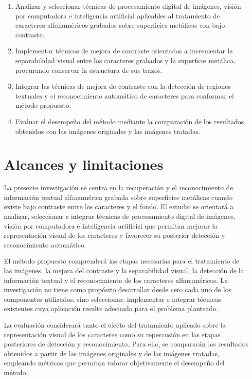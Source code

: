 \begin{enumerate}
    \item Analizar y seleccionar técnicas de procesamiento digital de imágenes, visión por computadora e inteligencia artificial aplicables al tratamiento de caracteres alfanuméricos grabados sobre superficies metálicas con bajo contraste.

    \item Implementar técnicas de mejora de contraste orientadas a incrementar la separabilidad visual entre los caracteres grabados y la superficie metálica, procurando conservar la estructura de sus trazos.

    \item Integrar las técnicas de mejora de contraste con la detección de regiones textuales y el reconocimiento automático de caracteres para conformar el método propuesto.

    \item Evaluar el desempeño del método mediante la comparación de los resultados obtenidos con las imágenes originales y las imágenes tratadas.
\end{enumerate}

\section{Alcances y limitaciones}
\label{sec:alcances_limitaciones}

La presente investigación se centra en la recuperación y el reconocimiento de información textual alfanumérica grabada sobre superficies metálicas cuando existe bajo contraste entre los caracteres y el fondo. El estudio se orientará a analizar, seleccionar e integrar técnicas de procesamiento digital de imágenes, visión por computadora e inteligencia artificial que permitan mejorar la representación visual de los caracteres y favorecer su posterior detección y reconocimiento automático.

El método propuesto comprenderá las etapas necesarias para el tratamiento de las imágenes, la mejora del contraste y la separabilidad visual, la detección de la información textual y el reconocimiento de los caracteres alfanuméricos. La investigación no tiene como propósito desarrollar desde cero cada uno de los componentes utilizados, sino seleccionar, implementar e integrar técnicas existentes cuya aplicación resulte adecuada para el problema planteado.

La evaluación considerará tanto el efecto del tratamiento aplicado sobre la representación visual de los caracteres como su repercusión en las etapas posteriores de detección y reconocimiento. Para ello, se compararán los resultados obtenidos a partir de las imágenes originales y de las imágenes tratadas, empleando métricas que permitan valorar objetivamente el desempeño del método.

